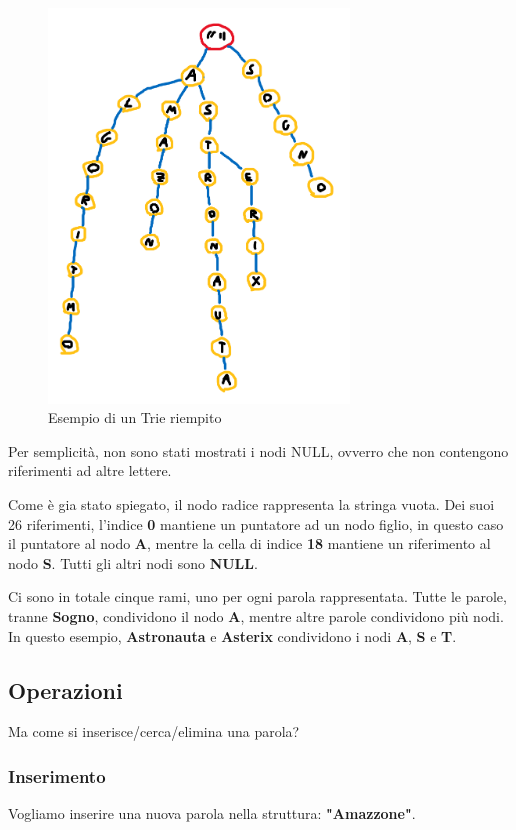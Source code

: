 \documentclass[a4paper, 12pt]{article}
\begin{document}
\begin{figure}[ht!]
    \centering
    \includegraphics[width=8cm]{Images/esempio trie riempitp.png}
    \caption{Esempio di un Trie riempito}
    \label{fig:filledtrie}
\end{figure}

Per semplicità, non sono stati mostrati i nodi NULL, ovverro che non contengono riferimenti ad altre lettere.

Come è gia stato spiegato, il nodo radice rappresenta la stringa vuota. Dei suoi 26 riferimenti, l'indice \textbf{0} mantiene un puntatore ad un nodo figlio, in questo caso il puntatore al nodo \textbf{A}, mentre la cella di indice \textbf{18} mantiene un riferimento al nodo \textbf{S}. Tutti gli altri nodi sono \textbf{NULL}.

Ci sono in totale cinque rami, uno per ogni parola rappresentata. Tutte le parole, tranne \textbf{Sogno}, condividono il nodo \textbf{A}, mentre altre parole condividono più nodi. In questo esempio, \textbf{Astronauta} e \textbf{Asterix} condividono i nodi \textbf{A}, \textbf{S} e \textbf{T}.

\subsection{Operazioni}
Ma come si inserisce/cerca/elimina una parola?
\subsubsection{Inserimento}
Vogliamo inserire una nuova parola nella struttura: \textbf{"Amazzone"}.
\end{document}
